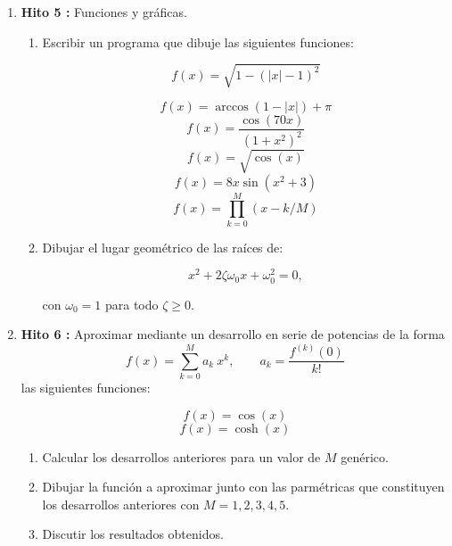 \documentclass[12pt,spanish]{article}
\begin{document}
\begin{enumerate}

    \item {\bf Hito 5 : }   Funciones y gráficas. 
 
 \begin{enumerate}    
 \item Escribir un programa que dibuje las siguientes funciones: 
 
 
 
 \begin{fleqn}
  \[ f(x)  = \sqrt{ 1 - ( |x| -1 )^2 } \]
  
  \[ f(x) = \arccos(1 - | x | )  + \pi \]
  \[ f(x) =  \frac{ \cos( 70 x ) }{ (1 + x^2 )^2  }\]
 \[ f(x) = \sqrt{ \cos(x) }  \]
  \[ f(x) =  8 x \sin( x^2 + 3)  \]
 \[ f(x) = \prod_{k=0} ^M ( x - k/M )  \]
 \end{fleqn}
 
\item Dibujar el lugar geométrico de las raíces de: 

\[ x^2 + 2 \zeta \omega_0 x + \omega_0 ^2 = 0,\]

con $ \omega_0 = 1 $ para todo $ \zeta \ge 0$. 
 
\end{enumerate}



    \item {\bf Hito 6 :}  Aproximar  mediante un desarrollo en serie de potencias de la forma
    \[  f(x) = \sum_{k=0} ^M a_k \  x^k, \qquad a_k = \frac{  f^{(k)} (0)  }{ k! }  \]  
    las  siguientes funciones: 
   
    \begin{fleqn}
  \[   f(x)  = \cos(x)  \]
    \[ f(x) = \cosh(x) \]
 \end{fleqn}
    
 
 
 
 \begin{enumerate}
   \item Calcular los desarrollos anteriores para un valor de $ M $ genérico.  
   \item  Dibujar la función a aproximar junto con las parmétricas que constituyen los desarrollos anteriores con $ M=1, 2, 3, 4, 5. $
   \item Discutir los resultados obtenidos.
 \end{enumerate}
 
 


\end{enumerate}
\end{document}
